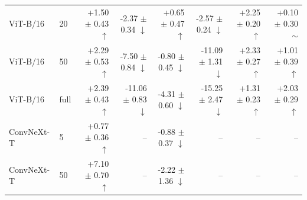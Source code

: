 \begin{table}[H]
{\begin{tabular}{llrrrrrr}
ViT-B/16 & 20 & +1.50 $\pm$ 0.43 $\uparrow$ & -2.37 $\pm$ 0.34 $\downarrow$ & +0.65 $\pm$ 0.47 $\uparrow$ & -2.57 $\pm$ 0.24 $\downarrow$ & +2.25 $\pm$ 0.20 $\uparrow$ & +0.10 $\pm$ 0.30 $\sim$ \\
ViT-B/16 & 50 & +2.29 $\pm$ 0.53 $\uparrow$ & -7.50 $\pm$ 0.84 $\downarrow$ & -0.80 $\pm$ 0.45 $\downarrow$ & -11.09 $\pm$ 1.31 $\downarrow$ & +2.33 $\pm$ 0.27 $\uparrow$ & +1.01 $\pm$ 0.39 $\uparrow$ \\
ViT-B/16 & full & +2.39 $\pm$ 0.43 $\uparrow$ & -11.06 $\pm$ 0.83 $\downarrow$ & -4.31 $\pm$ 0.60 $\downarrow$ & -15.25 $\pm$ 2.47 $\downarrow$ & +1.31 $\pm$ 0.23 $\uparrow$ & +2.03 $\pm$ 0.29 $\uparrow$ \\
\midrule
ConvNeXt-T & 5 & +0.77 $\pm$ 0.36 $\uparrow$ & -- & -0.88 $\pm$ 0.37 $\downarrow$ & -- & -- & -- \\
ConvNeXt-T & 50 & +7.10 $\pm$ 0.70 $\uparrow$ & -- & -2.22 $\pm$ 1.36 $\downarrow$ & -- & -- & -- \\
\bottomrule
\end{tabular}}
\end{table}
